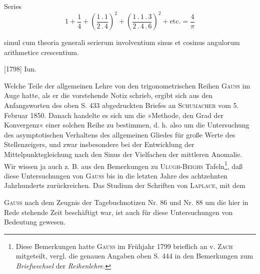 \indent Series
\begingroup
\makeatletter\tagsleft@true\let\veqno\@@leqno\makeatother
\begin{equation}
1+\frac14+\left(\frac{1\,.\,1}{2\,.\,4}\right)^2+\left(\frac{1\,.\,1\,.\,3}{2\,.\,4\,.\,6}\right)^2+\text{etc.}=\frac4\pi\tag*{[1]}
\end{equation}
\par\endgroup
\noindent simul cum theoria generali serierum involventium sinus et cosinus angulorum arithmetice crescentium.
\par\noindent\hfill[1798] Iun.

\medskip\begingroup\small
\renewcommand{\thefootnote}{\ensuremath{\dagger})}
\indent Welche Teile der allgemeinen Lehre von den trigonometrischen Reihen \textsc{Gauss} im Auge hatte, als er die vorstehende Notiz schrieb, ergibt sich aus den Anfangsworten des oben S. 433 abgedruckten Briefes an \textsc{Schumacher} vom 5. Februar 1850. Danach handelte es sich um die »Methode, den Grad der Konvergenz« einer solchen Reihe zu bestimmen, d. h. also um die Untersuchung des asymptotischen Verhaltens des allgemeinen Gliedes für große Werte des Stellenzeigers, und zwar insbesondere bei der Entwicklung der Mittelpunktsgleichung nach den Sinus der Vielfachen der mittleren Anomalie. Wir wissen ja auch z. B. aus den Bemerkungen zu \textsc{Ulugh-Beighs} Tafeln\footnote{Diese Bemerkungen hatte \textsc{Gauss} im Frühjahr 1799 brieflich an v. \textsc{Zach} mitgeteilt, vergl. die genauen Angaben oben S. 444 in den Bemerkungen zum \textit{Briefwechsel} der \textit{Reihenlehre}.}, daß diese Untersuchungen von \textsc{Gauss} bis in die letzten Jahre des achtzehnten Jahrhunderts zurückreichen. Das Studium der Schriften von \textsc{Laplace}, mit dem
\par\endgroup

\clearpage{}
\begingroup\small
\makeatletter\tagsleft@true\let\veqno\@@leqno\makeatother
\noindent \textsc{Gauss} nach dem Zeugnis der Tagebuchnotizen Nr. 86 und Nr. 88 um die hier in Rede stehende Zeit beschäftigt war, ist auch für diese Untersuchungen von Bedeutung gewesen.

